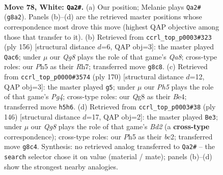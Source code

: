 \documentclass[11pt]{article}
\begin{document}
\clearpage

\begin{figure}[p]\centering
\begin{subfigure}{0.46\textwidth}\centering
\resizebox{\linewidth}{!}{%
\newchessgame
\chessboard[
  setfen={1Q4Q1/4P3/8/k6P/8/8/4K3/8 w - - 1 78},
  showmover=false,
  pgfstyle=straightmove, color=movearrow, markmove={g8-a2}
]}
\caption{}
\end{subfigure}\hfill
\begin{subfigure}{0.46\textwidth}\centering
\resizebox{\linewidth}{!}{%
\newchessgame
\chessboard[
  setfen={Q3Q3/7R/8/5K2/3k4/8/8/8 w - - 1 79},
  showmover=false,
  pgfstyle=straightmove, color=movearrow, markmove={a8-c6}
]}
\caption{}
\end{subfigure}
\\[4pt]
\begin{subfigure}{0.46\textwidth}\centering
\resizebox{\linewidth}{!}{%
\newchessgame
\chessboard[
  setfen={Q7/4k3/7K/8/4B1P1/8/8/8 w - - 2 86},
  showmover=false,
  pgfstyle=straightmove, color=movearrow, markmove={g4-g5}
]}
\caption{}
\end{subfigure}\hfill
\begin{subfigure}{0.46\textwidth}\centering
\resizebox{\linewidth}{!}{%
\newchessgame
\chessboard[
  setfen={8/6K1/k7/8/1Q6/8/2bB4/8 w - - 3 74},
  showmover=false,
  pgfstyle=straightmove, color=movearrow, markmove={d2-e3}
]}
\caption{}
\end{subfigure}
\caption{\textbf{Move 78, White: \texttt{Qa2\#}.} (a) Our position; Melanie plays \texttt{Qa2\#} (\texttt{g8a2}). Panels (b)--(d) are the retrieved master positions whose correspondence most drove this move (highest QAP objective among those that transfer to it). (b) Retrieved from \texttt{ccrl\_top\_p0003\#323} (ply 156) [structural distance $d$=6, QAP obj=3]: the master played \texttt{Qac6}; under $\mu$ our \emph{Qg8} plays the role of that game's \emph{Qa8}; cross-type roles: our \emph{P}h5 as their \emph{R}h7; transferred move \texttt{g8c8}. (c) Retrieved from \texttt{ccrl\_top\_p0000\#3574} (ply 170) [structural distance $d$=12, QAP obj=3]: the master played \texttt{g5}; under $\mu$ our \emph{Ph5} plays the role of that game's \emph{Pg4}; cross-type roles: our \emph{Q}g8 as their \emph{B}e4; transferred move \texttt{h5h6}. (d) Retrieved from \texttt{ccrl\_top\_p0003\#38} (ply 146) [structural distance $d$=17, QAP obj=2]: the master played \texttt{Be3}; under $\mu$ our \emph{Qg8} plays the role of that game's \emph{Bd2} (a \textbf{cross-type} correspondence); cross-type roles: our \emph{P}h5 as their \emph{b}c2; transferred move \texttt{g8c4}. Synthesis: no retrieved analog transferred to \texttt{Qa2\#} -- the \texttt{search} selector chose it on value (material / mate); panels (b)--(d) show the strongest nearby analogies.}
\label{fig:thought-m154}
\end{figure}
\end{document}
